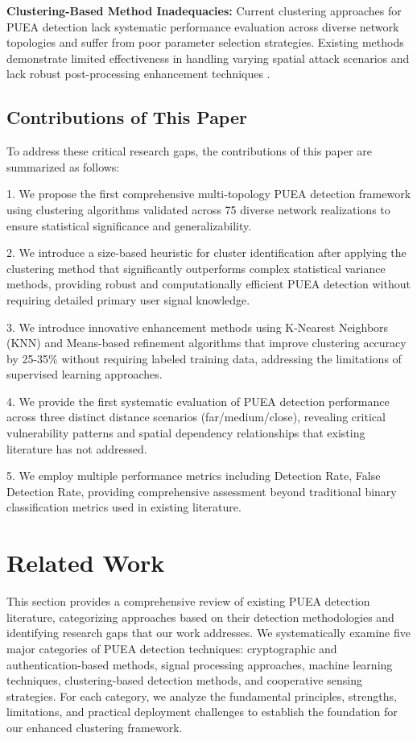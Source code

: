 \documentclass[pdflatex,sn-mathphys-num]{sn-jnl}%
\theoremstyle{thmstyleone}
\theoremstyle{thmstyletwo}
\theoremstyle{thmstylethree}
\begin{document}
\textbf{Clustering-Based Method Inadequacies:} Current clustering approaches for PUEA detection lack systematic performance evaluation across diverse network topologies and suffer from poor parameter selection strategies. Existing methods demonstrate limited effectiveness in handling varying spatial attack scenarios and lack robust post-processing enhancement techniques \cite{ref12,ref13,ref21}.

\subsection{Contributions of This Paper}

To address these critical research gaps, the contributions of this paper are summarized as follows:

1. We propose the first comprehensive multi-topology PUEA detection framework using clustering algorithms validated across 75 diverse network realizations to ensure statistical significance and generalizability.

2. We introduce a size-based heuristic for cluster identification after applying the clustering method that significantly outperforms complex statistical variance methods, providing robust and computationally efficient PUEA detection without requiring detailed primary user signal knowledge.

3. We introduce innovative enhancement methods using K-Nearest Neighbors (KNN) and Means-based refinement algorithms that improve clustering accuracy by 25-35\% without requiring labeled training data, addressing the limitations of supervised learning approaches.

4. We provide the first systematic evaluation of PUEA detection performance across three distinct distance scenarios (far/medium/close), revealing critical vulnerability patterns and spatial dependency relationships that existing literature has not addressed.

5. We employ multiple performance metrics including Detection Rate, False Detection Rate, providing comprehensive assessment beyond traditional binary classification metrics used in existing literature.

\section{Related Work}\label{sec2}

This section provides a comprehensive review of existing PUEA detection literature, categorizing approaches based on their detection methodologies and identifying research gaps that our work addresses. We systematically examine five major categories of PUEA detection techniques: cryptographic and authentication-based methods, signal processing approaches, machine learning techniques, clustering-based detection methods, and cooperative sensing strategies. For each category, we analyze the fundamental principles, strengths, limitations, and practical deployment challenges to establish the foundation for our enhanced clustering framework.
\end{document}

